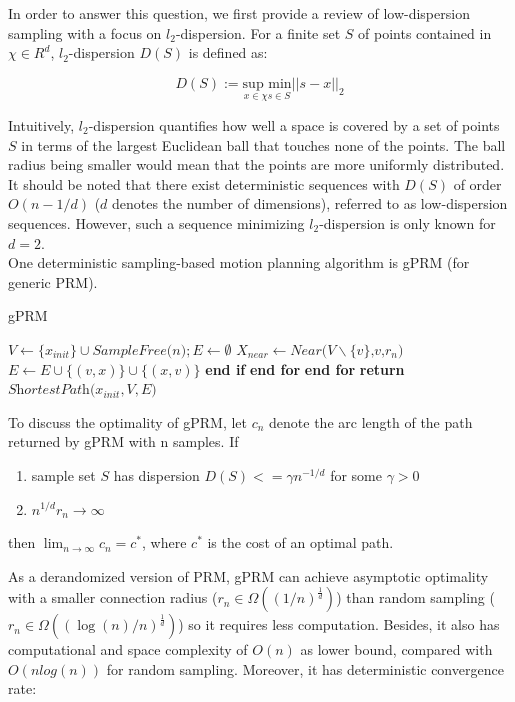 \documentclass[twoside]{article}
\begin{document}
In order to answer this question, we first provide a review of low-dispersion sampling with a focus on $l_2$-dispersion. For a finite set $S$ of points contained in $\chi \in R^d$, $l_2$-dispersion $D(S)$ is defined as:

\begin{equation}
    D(S) := \underset{x\in \chi s \in S}{\text{sup min}} ||s - x||_2
\end{equation}

Intuitively, $l_2$-dispersion quantifies how well a space is covered by a set of points $S$ in terms of the largest Euclidean ball that touches none of the points. The ball radius being smaller would mean that the points are more uniformly distributed. It should be noted that there exist deterministic sequences with $D(S)$ of order $O(n-1/d)$ ($d$ denotes the number of dimensions), referred to as low-dispersion sequences. However, such a sequence minimizing $l_2$-dispersion is only known for $d = 2$.\\

One deterministic sampling-based motion planning algorithm is gPRM (for generic PRM).

\begin{algorithm}
\caption{gPRM}\label{euclid}
\begin{algorithmic}[1]
\State $\textit{V} \gets \{x_{init}\} \cup \textit{SampleFree(n)}; E \gets \emptyset$
\State $X_{near} \gets  \textit{Near(V$\backslash$\{v\},v,$r_{n}$)}$
  	\State $E \gets E \cup \{(v,x)\} \cup \{(x,v)\}$
  \EndIf
  \State \textbf{end if}
 \EndFor
 \State \textbf{end for}
\EndFor
\State \textbf{end for}
\State \textbf{return} $\textit{ShortestPath($x_{init},V,E$)}$
\end{algorithmic}
\end{algorithm}

To discuss the optimality of gPRM, let $c_n$ denote the arc length of the path returned by gPRM with n samples. If
\begin{enumerate}
\item sample set $S$ has dispersion $D(S)<=\gamma n^{-1/d}$ for some $\gamma > 0$
\item $n^{1/d} r_n \rightarrow \infty$
\end{enumerate}
then $\lim_{n \to \infty} c_n = c^*$, where $c^*$ is the cost of an optimal path.

As a derandomized version of PRM, gPRM can achieve asymptotic optimality with a smaller connection radius ($r_n \in \Omega((1/n)^\frac{1}{d})$) than random sampling ($r_n \in \Omega((\log(n)/n)^\frac{1}{d})$) so it requires less computation. Besides, it also has computational and space complexity of $O(n)$ as lower bound, compared with $O(nlog(n))$ for random sampling. Moreover, it has deterministic convergence rate:
\end{document}
